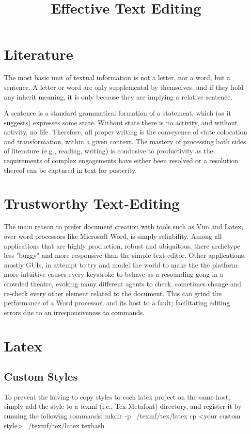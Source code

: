 \documentclass{article}
\title{Effective Text Editing}
\begin{document}
\tableofcontents
\clearpage


\section{Literature}
The most basic unit of textual information is not a letter, nor a word, but a sentence.  A letter or word are only supplemental by themselves, and if they hold any inherit meaning, it is only because they are implying a relative sentence.

A sentence is a standard grammatical formation of a statement, which (as it suggests) expresses some state.  Without state there is no activity, and without activity, no life.  Therefore, all proper writing is the conveyence of state colocation and transformation, within a given context.  The mastery of processing both sides of literature (e.g., reading, writing) is condusive to productivity as the requirements of complex engagements have either been resolved or a resolution thereof can be captured in text for posterity.

\section{Trustworthy Text-Editing}
The main reason to prefer document creation with tools such as Vim and Latex, over word processors like Microsoft Word, is simply reliability.  Among all applications that are highly production, robust and ubiquitous, there archetype less "buggy" and more responsive than the simple text editor.  Other applications, mostly GUIs, in attempt to try and model the world to make the the platform more intuitive causes every keystroke to behave as a resounding gong in a crowded theatre, evoking many different agents to check, sometimes change and re-check every other element related to the document.  This can grind the performance of a Word processor, and its host to a fault; facilitating editing errors due to an irresponsiveness to commands. 

\section{Latex}
\subsection{Custom Styles}
To prevent the having to copy styles to each latex project on the same host, simply add the style to a texmf (i.e., Tex Metafont) directory, and register it by running the following commands:
mkdir -p ~/texmf/tex/latex
cp <your custom style> ~/texmf/tex/latex
texhash
\end{document}
